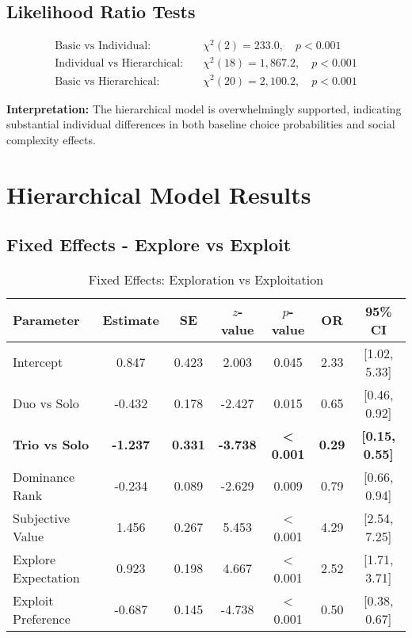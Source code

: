 \documentclass[11pt,a4paper]{article}
\begin{document}
\subsection{Likelihood Ratio Tests}
\begin{align}
\text{Basic vs Individual:} &\quad \chi^2(2) = 233.0, \quad p < 0.001\\
\text{Individual vs Hierarchical:} &\quad \chi^2(18) = 1,867.2, \quad p < 0.001\\
\text{Basic vs Hierarchical:} &\quad \chi^2(20) = 2,100.2, \quad p < 0.001
\end{align}

\textbf{Interpretation:} The hierarchical model is overwhelmingly supported, indicating substantial individual differences in both baseline choice probabilities and social complexity effects.

\section{Hierarchical Model Results}

\subsection{Fixed Effects - Explore vs Exploit}

\begin{table}[H]
\centering
\caption{Fixed Effects: Exploration vs Exploitation}
\begin{tabular}{lcccccc}
\toprule
Parameter & Estimate & SE & $z$-value & $p$-value & OR & 95\% CI \\
\midrule
Intercept & 0.847 & 0.423 & 2.003 & 0.045 & 2.33 & [1.02, 5.33] \\
Duo vs Solo & -0.432 & 0.178 & -2.427 & 0.015 & 0.65 & [0.46, 0.92] \\
\textbf{Trio vs Solo} & \textbf{-1.237} & \textbf{0.331} & \textbf{-3.738} & \textbf{< 0.001} & \textbf{0.29} & \textbf{[0.15, 0.55]} \\
Dominance Rank & -0.234 & 0.089 & -2.629 & 0.009 & 0.79 & [0.66, 0.94] \\
Subjective Value & 1.456 & 0.267 & 5.453 & < 0.001 & 4.29 & [2.54, 7.25] \\
Explore Expectation & 0.923 & 0.198 & 4.667 & < 0.001 & 2.52 & [1.71, 3.71] \\
Exploit Preference & -0.687 & 0.145 & -4.738 & < 0.001 & 0.50 & [0.38, 0.67] \\
\bottomrule
\end{tabular}
\end{table}
\end{document}
